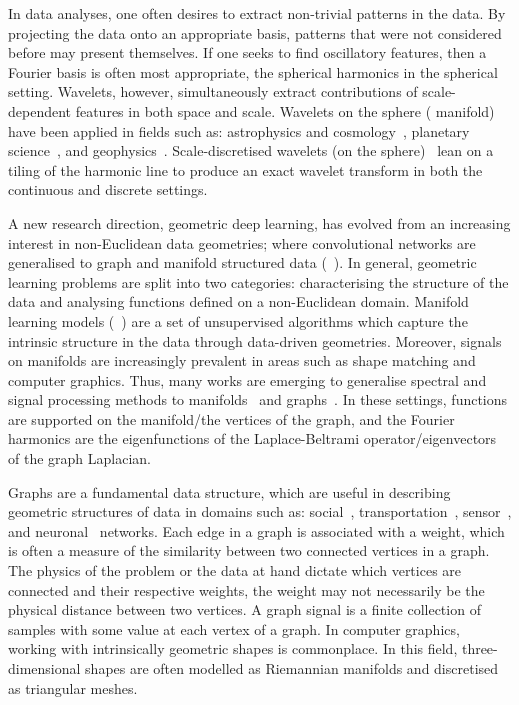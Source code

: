 In data analyses, one often desires to extract non-trivial patterns in the data.
By projecting the data onto an appropriate basis, patterns that were not considered before may present themselves.
If one seeks to find oscillatory features, then a Fourier basis is often most appropriate, \ie{} the spherical harmonics in the spherical setting.
Wavelets, however, simultaneously extract contributions of scale-dependent features in both space and scale.
Wavelets on the sphere (\cf{} manifold) have been applied in fields such as: astrophysics and cosmology~\cite{Pen1999,Barreiro2001,Rocha2004,McEwen2004}, planetary science~\cite{Audet2011,Audet2014}, and geophysics~\cite{Loris2010,Simons2011,Simons2011b}.
Scale-discretised wavelets (on the sphere)~\cite{Wiaux2008,McEwen2018,Leistedt2013,McEwen2013,McEwen2015} lean on a tiling of the harmonic line to produce an exact wavelet transform in both the continuous and discrete settings.

A new research direction, geometric deep learning, has evolved from an increasing interest in non-Euclidean data geometries; where convolutional networks are generalised to graph and manifold structured data (\eg{}~\cite{Bronstein2017,Perlmutter2020}).
In general, geometric learning problems are split into two categories: characterising the structure of the data and analysing functions defined on a non-Euclidean domain.
Manifold learning models (\eg{}~\cite{Tenenbaum2000,Coifman2006b,VanDerMaaten2008}) are a set of unsupervised algorithms which capture the intrinsic structure in the data through data-driven geometries.
Moreover, signals on manifolds are increasingly prevalent in areas such as shape matching and computer graphics.
Thus, many works are emerging to generalise spectral and signal processing methods to manifolds~\cite{Coifman2006} and graphs~\cite{Shuman2013}.
In these settings, functions are supported on the manifold/the vertices of the graph, and the Fourier harmonics are the eigenfunctions of the Laplace-Beltrami operator/eigenvectors of the graph Laplacian.

Graphs are a fundamental data structure, which are useful in describing geometric structures of data in domains such as: social~\cite{Nettleton2013}, transportation~\cite{Mohan2014}, sensor~\cite{Kenniche2010}, and neuronal~\cite{Tang2012} networks.
Each edge in a graph is associated with a weight, which is often a measure of the similarity between two connected vertices in a graph.
The physics of the problem or the data at hand dictate which vertices are connected and their respective weights, \ie{} the weight may not necessarily be the physical distance between two vertices.
A graph signal is a finite collection of samples with some value at each vertex of a graph.
In computer graphics, working with intrinsically geometric shapes is commonplace.
In this field, three-dimensional shapes are often modelled as Riemannian manifolds and discretised as triangular meshes.

